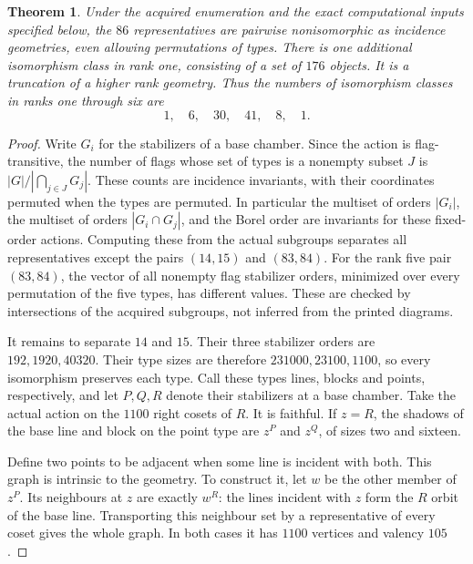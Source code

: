 \documentclass[11pt]{article}
\newtheorem{theorem}{Theorem}
\begin{document}
\begin{theorem}\label{classification}
Under the acquired enumeration and the exact computational inputs
specified below, the $86$ representatives are pairwise nonisomorphic
as incidence geometries, even allowing permutations of types. There
is one additional isomorphism class in rank one, consisting of a set
of $176$ objects. It is a truncation of a higher rank geometry.
Thus the numbers of isomorphism classes in ranks one through six are
\[
                  1,\quad6,\quad30,\quad41,\quad8,\quad1.
\]
\end{theorem}
\begin{proof}
Write $G_i$ for the stabilizers of a base chamber. Since the action is
flag-transitive, the number of flags whose set of types is a nonempty
subset $J$ is $|G|/|\bigcap_{j\in J}G_j|$. These counts are incidence
invariants, with their coordinates permuted when the types are
permuted. In particular the multiset of orders $|G_i|$, the multiset
of orders $|G_i\cap G_j|$, and the Borel order are invariants for
these fixed-order actions. Computing these from the actual subgroups
separates all representatives except the pairs $(14,15)$ and $(83,84)$.
For the rank five pair $(83,84)$, the vector of all nonempty flag
stabilizer orders, minimized over every permutation of the five types,
has different values. These are checked by intersections of the
acquired subgroups, not inferred from the printed diagrams.

It remains to separate $14$ and $15$. Their three stabilizer orders
are $192,1920,40320$. Their type sizes are therefore
$231000,23100,1100$, so every isomorphism preserves each type.
Call these types lines, blocks and points, respectively, and let
$P,Q,R$ denote their stabilizers at a base chamber. Take the actual
action on the $1100$ right cosets of $R$. It is faithful. If $z=R$,
the shadows of the base line and block on the point type are
$z^P$ and $z^Q$, of sizes two and sixteen.

Define two points to be adjacent when some line is incident with both.
This graph is intrinsic to the geometry. To construct it, let $w$ be
the other member of $z^P$. Its neighbours at $z$ are exactly $w^R$:
the lines incident with $z$ form the $R$ orbit of the base line.
Transporting this neighbour set by a representative of every coset
gives the whole graph. In both cases it has $1100$ vertices and
valency $105$.


\end{proof}
\end{document}
